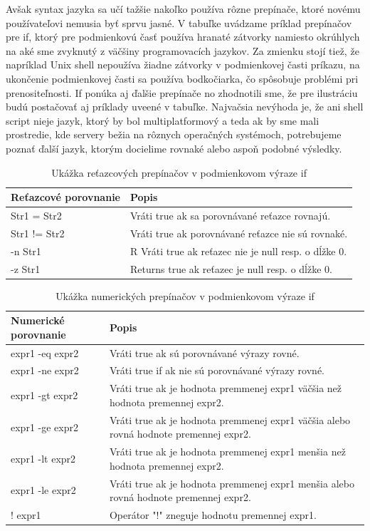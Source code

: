 Avšak syntax jazyka sa učí tažšie nakoľko používa rôzne prepínače, ktoré novému používateľovi nemusia byť sprvu jasné. 
V tabuľke uvádzame príklad prepínačov pre if, ktorý pre podmienkovú časť používa hranaté zátvorky namiesto okrúhlych na aké sme zvyknutý z väčšiny programovacích jazykov. Za zmienku stojí tiež, že napríklad Unix shell nepoužíva žiadne zátvorky v podmienkovej časti príkazu, na ukončenie podmienkovej časti sa používa bodkočiarka, čo spôsobuje problémi pri prenositeľnosti. If ponúka aj ďalšie prepínače no zhodnotili sme, že pre ilustráciu budú postačovať aj príklady uveené v tabuľke.
Najvačsia nevýhoda je, že ani shell script nieje jazyk, ktorý by bol multiplatformový a teda ak by sme mali prostredie, kde servery bežia na rôznych operačných systémoch, potrebujeme poznať ďalší jazyk, ktorým docielime rovnaké alebo aspoň podobné výsledky.
\newline
\begin{table}[h!]
	\centering
	\begin{tabular}{|p{4cm}|p{13cm}|}
		\hline
		Reťazcové porovnanie & Popis \\
		\hline
		Str1 = Str2	& Vráti true ak sa porovnávané reťazce rovnajú. \\ 
		\hline
		Str1 != Str2 &	Vráti true ak porovnávané reťazce nie sú rovnaké.\\ 
		\hline
		-n Str1	 &R Vráti true ak reťazec nie je null resp. o dĺžke 0.\\ 
		\hline
		-z Str1	& Returns true ak reťazec je null resp. o dĺžke 0.\\
		\hline
	\end{tabular}
\caption{Ukážka reťazcových prepínačov v podmienkovom výraze if \cite{shellprep}}
\label{table:1}

\end{table}
		\begin{table}[h!]
			\centering
			\begin{tabular}{|p{4cm}|p{13cm}|}
		\hline
		Numerické porovnanie	& Popis \\
		\hline
		expr1 -eq expr2	& Vráti true ak sú porovnávané výrazy rovné. \\
		\hline
		expr1 -ne expr2	& Vráti true if ak nie sú porovnávané výrazy rovné. \\
		\hline
		expr1 -gt expr2	& Vráti true ak je hodnota premmenej expr1 väčšia než hodnota premennej expr2. \\
		\hline
		expr1 -ge expr2	& Vráti true ak je hodnota premmenej expr1 väčšia alebo rovná hodnote premennej expr2. \\
		\hline
		expr1 -lt expr2	& Vráti true ak je hodnota premmenej expr1 menšia než hodnota premennej  expr2. \\
		\hline
		expr1 -le expr2	& Vráti true ak je hodnota premmenej expr1 menšia alebo rovná hodnote premennej expr2. \\
		\hline
		! expr1	& Operátor "!" zneguje hodnotu premennej expr1. \\
		\hline
	\end{tabular}
	\caption{Ukážka numerických prepínačov v podmienkovom výraze if \cite{shellprep}}
	\label{table:1}
	
\end{table}
\newpage

